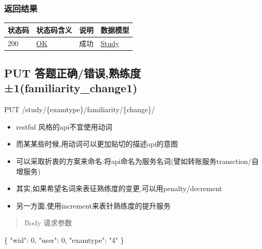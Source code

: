 \documentclass[
]{article}
\newenvironment{Shaded}{}{}
\newcommand{\DataTypeTok}[1]{\textcolor[rgb]{0.56,0.13,0.00}{#1}}
\newcommand{\DecValTok}[1]{\textcolor[rgb]{0.25,0.63,0.44}{#1}}
\newcommand{\FunctionTok}[1]{\textcolor[rgb]{0.02,0.16,0.49}{#1}}
\newcommand{\StringTok}[1]{\textcolor[rgb]{0.25,0.44,0.63}{#1}}
\begin{document}
\hypertarget{ux8fd4ux56deux7ed3ux679c-13}{%
\subsubsection{返回结果}\label{ux8fd4ux56deux7ed3ux679c-13}}

\begin{longtable}[]{@{}llll@{}}
\toprule
状态码 & 状态码含义 & 说明 & 数据模型 \\
\midrule
\endhead
200 & \href{https://tools.ietf.org/html/rfc7231\#section-6.3.1}{OK} &
成功 & \protect\hyperlink{schemastudy}{Study} \\
\bottomrule
\end{longtable}

\hypertarget{put-ux7b54ux9898ux6b63ux786eux9519ux8befux719fux7ec3ux5ea6uxb11familiaritychange1-2}{%
\subsection{PUT
答题正确/错误,熟练度±1(familiarity\_change1)}\label{put-ux7b54ux9898ux6b63ux786eux9519ux8befux719fux7ec3ux5ea6uxb11familiaritychange1-2}}

PUT /study/\{examtype\}/familiarity/\{change\}/

\begin{itemize}
\item
  restful 风格的api不宜使用动词
\item
  而某某些时候,用动词可以更加贴切的描述api的意图
\item
  可以采取折衷的方案来命名:将api命名为服务名词(譬如转账服务transction/自增服务)
\item
  其实,如果希望名词来表征熟练度的变更,可以用penalty/decrement
\item
  另一方面,使用increment来表针熟练度的提升服务
\end{itemize}

\begin{quote}
Body 请求参数
\end{quote}

\begin{Shaded}
\begin{Highlighting}[]
\FunctionTok{\{}
  \DataTypeTok{"wid"}\FunctionTok{:} \DecValTok{0}\FunctionTok{,}
  \DataTypeTok{"user"}\FunctionTok{:} \DecValTok{0}\FunctionTok{,}
  \DataTypeTok{"examtype"}\FunctionTok{:} \StringTok{"4"}
\FunctionTok{\}}
\end{Highlighting}
\end{Shaded}
\end{document}
